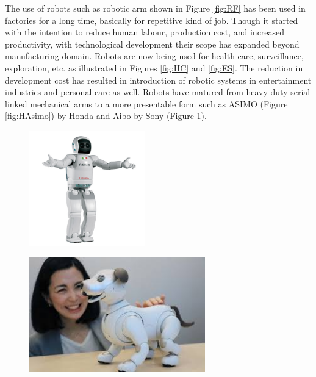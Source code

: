 The use of robots such as robotic arm shown in Figure \ref{fig:RF} has been used in factories for a long time, basically for repetitive kind  of job. Though it started with the intention to reduce human labour, production cost, and increased productivity, with technological development  their scope has expanded beyond  manufacturing domain. Robots are now being used for health care, surveillance, exploration, etc. as illustrated in Figures \ref{fig:HC} and \ref{fig:ES}. The reduction in development cost  has resulted in introduction of robotic systems in entertainment industries and personal care as well. Robots have matured from heavy duty serial linked mechanical arms to a more presentable form such as ASIMO (Figure \ref{fig:HAsimo}) by Honda and Aibo by Sony  (Figure \ref{fig:SA}).  
\begin{figure}
	\centering
	\begin{minipage}{.5\textwidth}
		\centering
		\includegraphics[height=5cm,keepaspectratio]{Chapter1/fig/Honda-Asimo}
		\label{fig:HAsimo}
	\end{minipage}%
	\begin{minipage}{.5\textwidth}
		\centering
		\includegraphics[width=.8\linewidth,height=5cm,keepaspectratio]{Chapter1/fig/aibo}
		\label{fig:SA}
	\end{minipage}
\end{figure}

